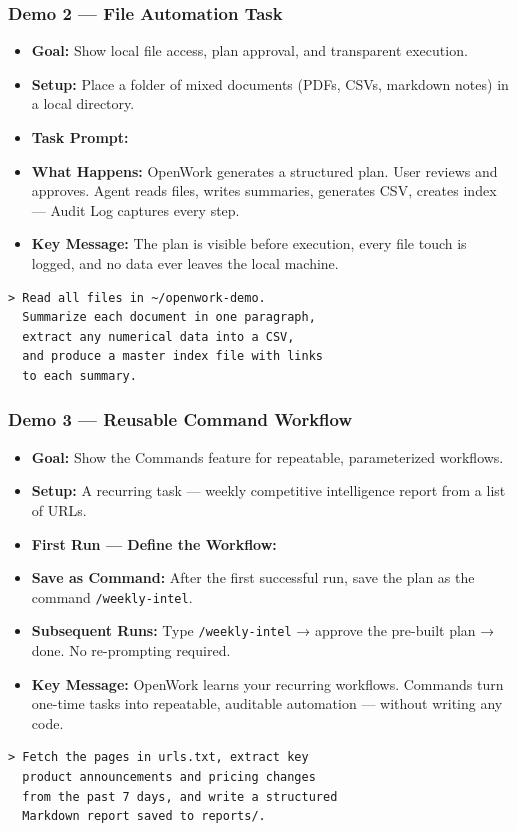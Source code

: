 \begin{frame}[fragile]\frametitle{Demo 2 — File Automation Task}
  \begin{itemize}
    \item \textbf{Goal:} Show local file access, plan approval, and transparent execution.
    \item \textbf{Setup:} Place a folder of mixed documents (PDFs, CSVs, markdown notes) in a local directory.
    \item \textbf{Task Prompt:}
    \item \textbf{What Happens:} OpenWork generates a structured plan. User reviews and approves. Agent reads files, writes summaries, generates CSV, creates index — Audit Log captures every step.
    \item \textbf{Key Message:} The plan is visible before execution, every file touch is logged, and no data ever leaves the local machine.
  \end{itemize}
\begin{lstlisting}
> Read all files in ~/openwork-demo.
  Summarize each document in one paragraph,
  extract any numerical data into a CSV,
  and produce a master index file with links
  to each summary.
\end{lstlisting}
\end{frame}

\begin{frame}[fragile]\frametitle{Demo 3 — Reusable Command Workflow}
  \begin{itemize}
    \item \textbf{Goal:} Show the Commands feature for repeatable, parameterized workflows.
    \item \textbf{Setup:} A recurring task — weekly competitive intelligence report from a list of URLs.
    \item \textbf{First Run — Define the Workflow:}
    \item \textbf{Save as Command:} After the first successful run, save the plan as the command \texttt{/weekly-intel}.
    \item \textbf{Subsequent Runs:} Type \texttt{/weekly-intel} → approve the pre-built plan → done. No re-prompting required.
    \item \textbf{Key Message:} OpenWork learns your recurring workflows. Commands turn one-time tasks into repeatable, auditable automation — without writing any code.
  \end{itemize}
\begin{lstlisting}
> Fetch the pages in urls.txt, extract key
  product announcements and pricing changes
  from the past 7 days, and write a structured
  Markdown report saved to reports/.
\end{lstlisting}
\end{frame}

